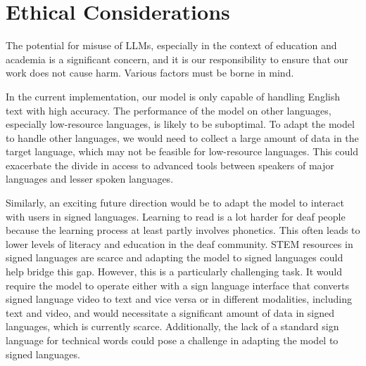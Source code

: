 \section{Ethical Considerations}
\label{sec:ethics}


The potential for misuse of LLMs, especially in the context of education and 
academia is a significant concern, and it is our responsibility to ensure that
our work does not cause harm. Various factors must be borne in mind. 

In the current implementation, our model is only capable of handling English
text with high accuracy. The performance of the model on other languages,
especially low-resource languages, is likely to be suboptimal. To adapt the
model to handle other languages, we would need to collect a large amount of data
in the target language, which may not be feasible for low-resource languages.
This could exacerbate the divide in access to advanced tools between speakers of
major languages and lesser spoken languages.

Similarly, an exciting future direction would be to adapt the model to interact
with users in signed languages. Learning to read is a lot harder for deaf people
because the learning process at least partly involves phonetics. This often
leads to lower levels of literacy and education in the deaf community.  STEM
resources in signed languages are scarce and adapting the model to signed
languages could help bridge this gap. However, this is a particularly
challenging task. It would require the model to operate either with a sign
language interface that converts signed language video to text and vice versa or
in different modalities, including text and video, and would necessitate a
significant amount of data in signed languages, which is currently scarce.
Additionally, the lack of a standard sign language for technical words could
pose a challenge in adapting the model to signed languages.

